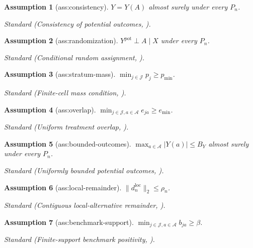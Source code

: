 \documentclass{article}
\newtheorem{assumption}{Assumption}
\begin{document}
\begin{assumption}[ass:consistency]\label{ass:consistency}
\(Y=Y(A)\) almost surely under every \(P_n\).
\par\smallskip\noindent\emph{Standard} (Consistency of potential outcomes, \cite{FangRidderXie2025}).
\end{assumption}

\begin{assumption}[ass:randomization]\label{ass:randomization}
\(Y^{\mathrm{pot}}\perp A\mid X\) under every \(P_n\).
\par\smallskip\noindent\emph{Standard} (Conditional random assignment, \cite{FangRidderXie2025}).
\end{assumption}

\begin{assumption}[ass:stratum-mass]\label{ass:stratum-mass}
\(\min_{j\in\mathcal J}p_j\ge p_{\min}\).
\par\smallskip\noindent\emph{Standard} (Finite-cell mass condition, \cite{FangRidderXie2025}).
\end{assumption}

\begin{assumption}[ass:overlap]\label{ass:overlap}
\(\min_{j\in\mathcal J,a\in\mathcal A}e_{ja}\ge e_{\min}\).
\par\smallskip\noindent\emph{Standard} (Uniform treatment overlap, \cite{FangRidderXie2025}).
\end{assumption}

\begin{assumption}[ass:bounded-outcomes]\label{ass:bounded-outcomes}
\(\max_{a\in\mathcal A}|Y(a)|\le B_Y\) almost surely under every \(P_n\).
\par\smallskip\noindent\emph{Standard} (Uniformly bounded potential outcomes, \cite{FangRidderXie2025}).
\end{assumption}

\begin{assumption}[ass:local-remainder]\label{ass:local-remainder}
\(\|d_n^{\mathrm{loc}}\|_2\le\rho_n\).
\par\smallskip\noindent\emph{Standard} (Contiguous local-alternative remainder, \cite{HiranoPorter2009}).
\end{assumption}

\begin{assumption}[ass:benchmark-support]\label{ass:benchmark-support}
\(\min_{j\in\mathcal J,a\in\mathcal A}b_{ja}\ge\beta\).
\par\smallskip\noindent\emph{Standard} (Finite-support benchmark positivity, \cite{FangRidderXie2025}).
\end{assumption}
\end{document}
